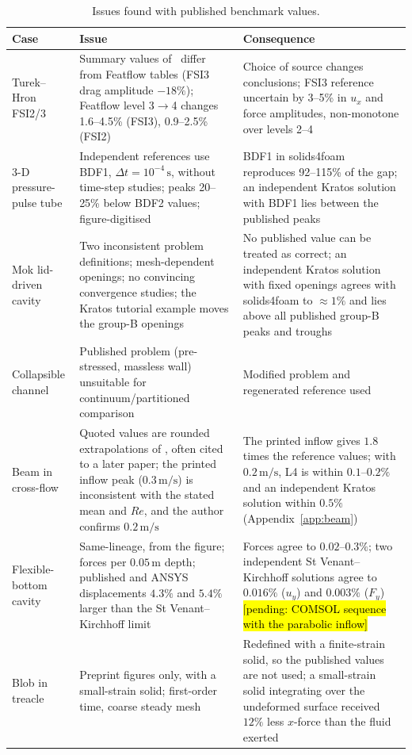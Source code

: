\begin{table}[htbp]
	\centering
	\footnotesize
	\setlength{\tabcolsep}{3pt}
	\caption{Issues found with published benchmark values.}
	\label{tab:published}
	\begin{tabular}{p{2.8cm}p{5.8cm}p{5.0cm}}
		\toprule
		Case & Issue & Consequence \\
		\midrule
		Turek--Hron FSI2/3 & Summary values of~\citet{Turek2006} differ from Featflow tables (FSI3 drag amplitude $-18\%$); Featflow level 3$\to$4 changes 1.6--4.5\% (FSI3), 0.9--2.5\% (FSI2) & Choice of source changes conclusions; FSI3 reference uncertain by 3--5\% in $u_x$ and force amplitudes, non-monotone over levels 2--4 \\
		3-D pressure-pulse tube & Independent references use BDF1, $\Delta t = 10^{-4}\,\mathrm{s}$, without time-step studies; peaks 20--25\% below BDF2 values; figure-digitised & BDF1 in solids4foam reproduces 92--115\% of the gap; an independent Kratos solution with BDF1 lies between the published peaks \\
		Mok lid-driven cavity & Two inconsistent problem definitions; mesh-dependent openings; no convincing convergence studies; the Kratos tutorial example moves the group-B openings & No published value can be treated as correct; an independent Kratos solution with fixed openings agrees with solids4foam to $\approx1\%$ and lies above all published group-B peaks and troughs \\
		Collapsible channel & Published problem (pre-stressed, massless wall) unsuitable for continuum/partitioned comparison & Modified problem and regenerated reference used \\
		Beam in cross-flow & Quoted values are rounded extrapolations of \citet{Richter2012}, often cited to a later paper; the printed inflow peak ($0.3\,\mathrm{m/s}$) is inconsistent with the stated mean and $Re$, and the author confirms $0.2\,\mathrm{m/s}$ & The printed inflow gives $1.8$ times the reference values; with $0.2\,\mathrm{m/s}$, L4 is within $0.1$--$0.2\%$ and an independent Kratos solution within $0.5\%$ (Appendix~\ref{app:beam}) \\
		Flexible-bottom cavity & Same-lineage, from the figure; forces per $0.05\,\mathrm{m}$ depth; published and ANSYS displacements $4.3\%$ and $5.4\%$ larger than the St Venant--Kirchhoff limit & Forces agree to $0.02$--$0.3\%$; two independent St Venant--Kirchhoff solutions agree to $0.016\%$ ($u_y$) and $0.003\%$ ($F_y$) \hl{[pending: COMSOL sequence with the parabolic inflow]} \\
		Blob in treacle & Preprint figures only, with a small-strain solid; first-order time, coarse steady mesh & Redefined with a finite-strain solid, so the published values are not used; a small-strain solid integrating over the undeformed surface received $12\%$ less $x$-force than the fluid exerted \\
		\bottomrule
	\end{tabular}
\end{table}


